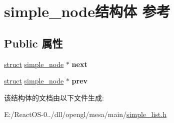 \hypertarget{structsimple__node}{}\section{simple\+\_\+node结构体 参考}
\label{structsimple__node}
\subsection*{Public 属性}
\begin{DoxyCompactItemize}
\item 
\mbox{\label{structsimple__node_a6ae6e6dc6eaae25510ffe869f314c1a5}} 
\hyperlink{interfacestruct}{struct} \hyperlink{structsimple__node}{simple\+\_\+node} $\ast$ {\bfseries next}
\item 
\mbox{\label{structsimple__node_a50fcb82b00320f0abc6b7243ba0ceebf}} 
\hyperlink{interfacestruct}{struct} \hyperlink{structsimple__node}{simple\+\_\+node} $\ast$ {\bfseries prev}
\end{DoxyCompactItemize}


该结构体的文档由以下文件生成\+:\begin{DoxyCompactItemize}
\item 
E\+:/\+React\+O\+S-\/0../dll/opengl/mesa/main/\hyperlink{simple__list_8h}{simple\+\_\+list.\+h}\end{DoxyCompactItemize}

